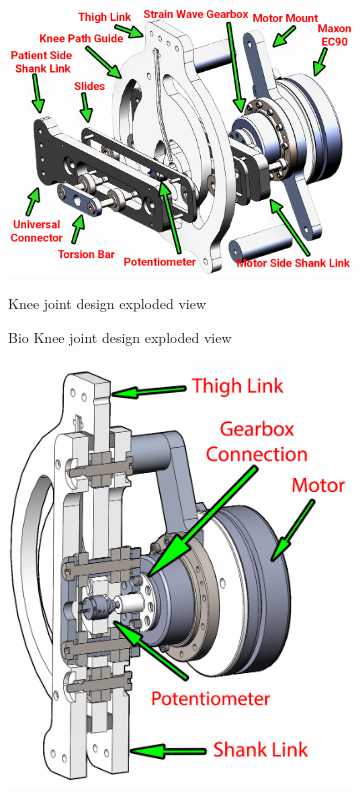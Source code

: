 \begin{figure}
    \begin{subfigure}{\textwidth}
        \centering
        \captionsetup{justification=centering}
        \includegraphics[scale=0.2]{images/mech_design/ExoKneeExplodedView.png}
        \caption{Bio Knee joint design exploded view}{Knee joint design exploded view}
        \label{fig:ExplodedViewLabeled}
    \end{subfigure}
    \begin{subfigure}{\textwidth}
        \centering
         \includegraphics[scale=0.2]{images/mech_design/KneeJointAssyCrossSection.png}

\end{subfigure}
\end{figure}
